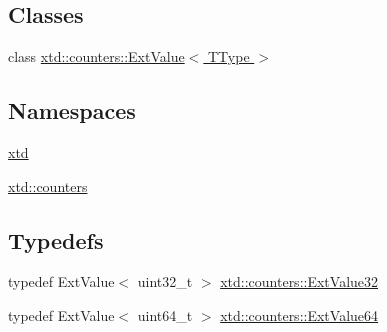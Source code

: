 \subsection*{Classes}
\begin{DoxyCompactItemize}
\item 
class \hyperlink{classxtd_1_1counters_1_1ExtValue}{xtd\+::counters\+::\+Ext\+Value$<$ T\+Type $>$}
\end{DoxyCompactItemize}
\subsection*{Namespaces}
\begin{DoxyCompactItemize}
\item 
 \hyperlink{namespacextd}{xtd}
\item 
 \hyperlink{namespacextd_1_1counters}{xtd\+::counters}
\end{DoxyCompactItemize}
\subsection*{Typedefs}
\begin{DoxyCompactItemize}
\item 
typedef Ext\+Value$<$ uint32\+\_\+t $>$ \hyperlink{namespacextd_1_1counters_ae049cff0f00adb1728a511d333c2aa50}{xtd\+::counters\+::\+Ext\+Value32}
\item 
typedef Ext\+Value$<$ uint64\+\_\+t $>$ \hyperlink{namespacextd_1_1counters_ad0d26d26ad71069f92a20b6d870e4872}{xtd\+::counters\+::\+Ext\+Value64}
\end{DoxyCompactItemize}
